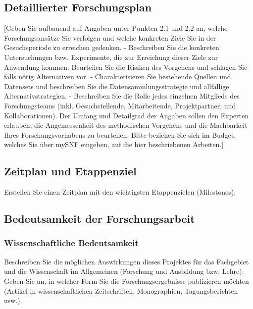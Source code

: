 \documentclass[11pt,ngerman,a4paper,]{scrartcl}
\begin{document}
\hypertarget{detaillierter-forschungsplan}{%
\subsection{Detaillierter
Forschungsplan}\label{detaillierter-forschungsplan}}

{[}Geben Sie aufbauend auf Angaben unter Punkten 2.1 und 2.2 an, welche
Forschungsansätze Sie verfolgen und welche konkreten Ziele Sie in der
Gesuchsperiode zu erreichen gedenken. - Beschreiben Sie die konkreten
Untersuchungen bzw. Experimente, die zur Erreichung dieser Ziele zur
Anwendung kommen. Beurteilen Sie die Risiken des Vorgehens und schlagen
Sie falls nötig Alternativen vor. - Charakterisieren Sie bestehende
Quellen und Datensets und beschreiben Sie die Datensammlungsstrategie
und allfällige Alternativstrategien. - Beschreiben Sie die Rolle jedes
einzelnen Mitglieds des Forschungsteams (inkl. Gesuchstellende,
Mitarbeitende, Projektpartner, und Kollaborationen). Der Umfang und
Detailgrad der Angaben sollen den Experten erlauben, die Angemessenheit
des methodischen Vorgehens und die Machbarkeit Ihres Forschungsvorhabens
zu beurteilen. Bitte beziehen Sie sich im Budget, welches Sie über mySNF
eingeben, auf die hier beschriebenen Arbeiten.{]}

\hypertarget{zeitplan-und-etappenziel}{%
\subsection{Zeitplan und Etappenziel}\label{zeitplan-und-etappenziel}}

Erstellen Sie einen Zeitplan mit den wichtigsten Etappenzielen
(Milestones).

\hypertarget{bedeutsamkeit-der-forschungsarbeit}{%
\subsection{Bedeutsamkeit der
Forschungsarbeit}\label{bedeutsamkeit-der-forschungsarbeit}}

\hypertarget{wissenschaftliche-bedeutsamkeit}{%
\subsubsection{Wissenschaftliche
Bedeutsamkeit}\label{wissenschaftliche-bedeutsamkeit}}

Beschreiben Sie die möglichen Auswirkungen dieses Projektes für das
Fachgebiet und die Wissenschaft im Allgemeinen (Forschung und Ausbildung
bzw. Lehre). Geben Sie an, in welcher Form Sie die Forschungsergebnisse
publizieren möchten (Artikel in wissenschaftlichen Zeitschriften,
Monographien, Tagungsberichten usw.).
\end{document}
